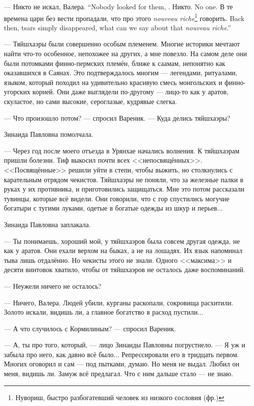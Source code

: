 {--- Никто не искал, Валера.}
{``Nobody looked for them, \Valera.}
{Никто.}
{No one.}
{В те времена цари без вести пропадали, что про этого \textit{nouveau riche}\footnote{Нувориш, быстро разбогатевший человек из низкого сословия (фр.)} говорить.}
{Back then, tsars simply disappeared, what can we say about that \textit{nouveau riche}.''}

\asterism

\textspace

--- Тяйшхаэры были совершенно особым племенем.
Многие историки мечтают найти что-то особенное, непохожее на других, а мне повезло.
На самом деле они были потомками финно-пермских племён, ближе к саамам, непонятно как оказавшихся в Саянах.
Это подтверждалось многим --- легендами, ритуалами, языком, который походил на удивительно красивую смесь монгольских и финно-угорских корней.
Они даже выглядели по-другому --- лицо-то как у аратов, скуластое, но сами высокие, сероглазые, кудрявые слегка.

--- Что произошло потом? --- спросил Вареник.
--- Куда делись тяйшхаэры?

Зинаида Павловна помолчала.

--- Через год после моего отъезда в Урянхае начались волнения.
К тяйшхаэрам пришли болезни.
Тиф выкосил почти всех <<непосвящённых>>.
<<Посвящённые>> решили уйти в степи, чтобы выжить, но столкнулись с карательным отрядом чекистов.
Тяйшхаэры не поняли, что за железные палки в руках у их противника, и приготовились защищаться.
Мне это потом рассказали тувинцы, которые всё видели.
Они говорили, что с гор спустились могучие богатыри с тугими луками, одетые в богатые одежды из шкур и перьев...

Зинаида Павловна заплакала.

--- Ты понимаешь, хороший мой, у тяйшхаэров была совсем другая одежда, не как у аратов.
Они ехали верхом на быках, а не на лошадях.
Их язык напоминал тыва лишь отдалённо.
Но чекисты этого не знали.
Одного <<максима>> и десяти винтовок хватило, чтобы от тяйшхаэров не осталось даже воспоминаний.

--- Неужели ничего не осталось?

--- Ничего, Валера.
Людей убили, курганы раскопали, сокровища расхитили.
Золото искали, видишь ли, а главное богатство в расход пустили...

--- А что случилось с Кормилиным? --- спросил Вареник.

--- А, ты про того, который, --- лицо Зинаиды Павловны погрустнело.
--- Я уж и забыла про него, как давно всё было...
Репрессировали его в тридцать первом.
Многих оговорил и сам --- под пытками, думаю.
Но меня не выдал.
Любил он меня, видишь ли.
Замуж всё предлагал.
Что с ним дальше стало --- не знаю.

